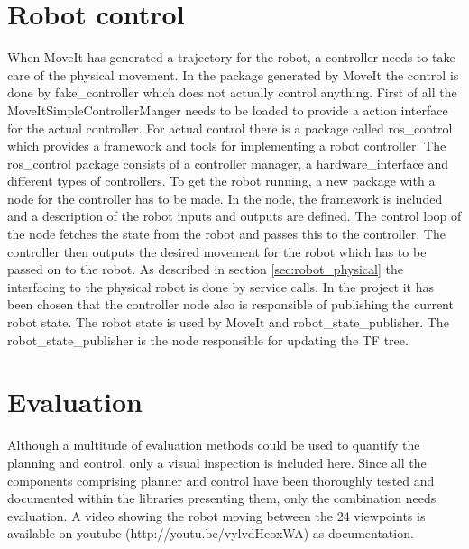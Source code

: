 \section{Robot control}
\label{sec:robot_control}
When MoveIt has generated a trajectory for the robot, a controller needs to take care of the physical movement. In the package generated by MoveIt the control is done by fake\_controller which does not actually control anything. First of all the MoveItSimpleControllerManger needs to be loaded to provide a action interface for the actual controller. For actual control there is a package called ros\_control which provides a framework and tools for implementing a robot controller. The ros\_control package consists of a controller manager, a hardware\_interface and different types of controllers. To get the robot running, a new package with a node for the controller has to be made. In the node, the framework is included and a description of the robot inputs and outputs are defined. The control loop of the node fetches the state from the robot and passes this to the controller. The controller then outputs the desired movement for the robot which has to be passed on to the robot. As described in section \ref{sec:robot_physical} the interfacing to the physical robot is done by service calls. In the project it has been chosen that the controller node also is responsible of publishing the current robot state. The robot state is used by MoveIt and robot\_state\_publisher. The robot\_state\_publisher is the node responsible for updating the TF tree. 




%

\section{Evaluation}
Although a multitude of evaluation methods could be used to quantify the planning and control, only a visual inspection is included here. Since all the components comprising planner and control have been thoroughly tested and documented within the libraries presenting them, only the combination needs evaluation. A video showing the robot moving between the 24 viewpoints is available on youtube (http://youtu.be/vylvdHeoxWA) as documentation.\\

